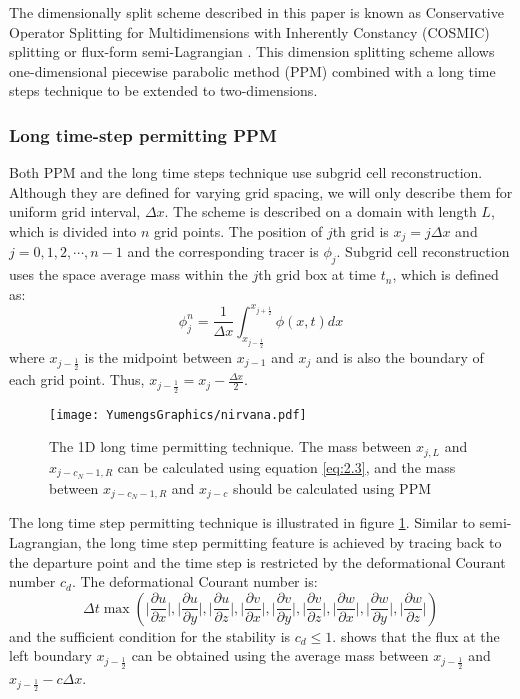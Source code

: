 The dimensionally split scheme described in this paper is known as Conservative Operator Splitting for Multidimensions with Inherently Constancy (COSMIC) splitting \citep{Leonard1996} or flux-form semi-Lagrangian \citep{Lin1996}. This dimension splitting scheme allows one-dimensional piecewise parabolic method (PPM) \citep{Colella1984} combined with a long time steps technique \citep{Leonard1995} to be extended to two-dimensions.
\subsubsection{Long time-step permitting PPM} 
\label{sec:PPM}
Both PPM and the long time steps technique use subgrid cell reconstruction. Although they are defined for varying grid spacing, we will only describe them for uniform grid interval, $\Delta x$. The scheme is described on a domain with length $L$, which is divided into $n$ grid points. The position of $j$th grid is $x_j = j\Delta x$ and $j = 0, 1, 2, \cdots, n-1$ and the corresponding tracer is $\phi_j$. Subgrid cell reconstruction uses the space average mass within the $j$th grid box at time $t_n$, which is defined as: 
\begin{equation} \label{eq:2.1} 
\phi^n_j = \frac{1}{\Delta x} \int^{x_{j+\frac{1}{2}}}_{x_{j-\frac{1}{2}}} \phi (x,t)dx
\end{equation}
where $x_{j-\frac{1}{2}}$ is the midpoint between $x_{j-1}$ and $x_{j}$ and is also the boundary of each grid point. Thus, $x_{j-\frac{1}{2}} = x_j - \frac{\Delta x}{2}$.
\begin{figure}
\centering
\texttt{[image: YumengsGraphics/nirvana.pdf]}
\caption{The 1D long time permitting technique. The mass between $x_{j,L}$ and $x_{j-c_N-1,R}$ can be calculated using equation \ref{eq:2.3}, and the mass between $x_{j-c_N-1,R}$ and $x_{j-c}$ should be calculated using PPM \label{fig:2.1}}
\end{figure}

The long time step permitting technique is illustrated in figure \ref{fig:2.1}. Similar to semi-Lagrangian, the long time step permitting feature is achieved by tracing back to the departure point and the time step is restricted by the deformational Courant number $c_d$. The deformational Courant number is:
\begin{equation}
\Delta t \max
\left(\biggl|\frac{\partial u}{\partial x}\biggr|,\biggl|\frac{\partial u}{\partial y}\biggr|,\biggl|\frac{\partial u}{\partial z}\biggr|,\biggl|\frac{\partial v}{\partial x}\biggr|,\biggl|\frac{\partial v}{\partial y}\biggr|,\biggl|\frac{\partial v}{\partial z}\biggr|,\biggl|\frac{\partial w}{\partial x}\biggr|,\biggl|\frac{\partial w}{\partial y}\biggr|,\biggl|\frac{\partial w}{\partial z}\biggr|\right)
\label{eq:cd}
\end{equation}
\citep{PS84} and the sufficient condition for the stability is $c_d \leq 1$. \cite{Leonard1995} shows that the flux at the left boundary $x_{j-\frac{1}{2}}$ can be obtained using the average mass between $x_{j-\frac{1}{2}}$ and $x_{j-\frac{1}{2}}-c\Delta x$.

